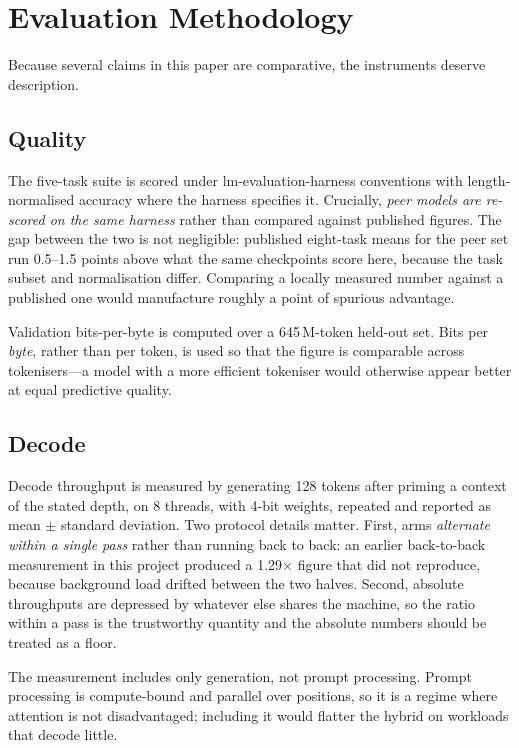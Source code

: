 \documentclass[conference]{IEEEtran}
\begin{document}
\section{Evaluation Methodology}
\label{sec:evalmethod}

Because several claims in this paper are comparative, the instruments deserve
description.

\subsection{Quality}

The five-task suite is scored under lm-evaluation-harness conventions with
length-normalised accuracy where the harness specifies it. Crucially, \emph{peer
models are re-scored on the same harness} rather than compared against published
figures. The gap between the two is not negligible: published eight-task means
for the peer set run 0.5--1.5 points above what the same checkpoints score here,
because the task subset and normalisation differ. Comparing a locally measured
number against a published one would manufacture roughly a point of spurious
advantage.

Validation bits-per-byte is computed over a 645\,M-token held-out set. Bits per
\emph{byte}, rather than per token, is used so that the figure is comparable
across tokenisers---a model with a more efficient tokeniser would otherwise
appear better at equal predictive quality.

\subsection{Decode}

Decode throughput is measured by generating 128 tokens after priming a context
of the stated depth, on 8 threads, with 4-bit weights, repeated and reported as
mean $\pm$ standard deviation. Two protocol details matter. First, arms
\emph{alternate within a single pass} rather than running back to back: an
earlier back-to-back measurement in this project produced a 1.29$\times$ figure
that did not reproduce, because background load drifted between the two halves.
Second, absolute throughputs are depressed by whatever else shares the machine,
so the ratio within a pass is the trustworthy quantity and the absolute numbers
should be treated as a floor.

The measurement includes only generation, not prompt processing. Prompt
processing is compute-bound and parallel over positions, so it is a regime where
attention is not disadvantaged; including it would flatter the hybrid on
workloads that decode little.
\end{document}
